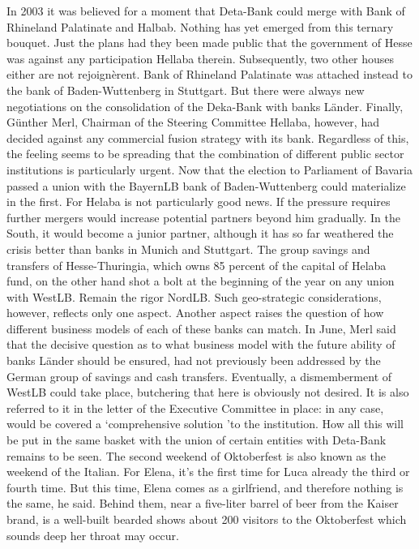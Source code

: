 In 2003 it was believed for a moment that Deta-Bank could merge with Bank of Rhineland Palatinate and Halbab.
Nothing has yet emerged from this ternary bouquet.
Just the plans had they been made public that the government of Hesse was against any participation Hellaba therein.
Subsequently, two other houses either are not rejoignèrent.
Bank of Rhineland Palatinate was attached instead to the bank of Baden-Wuttenberg in Stuttgart.
But there were always new negotiations on the consolidation of the Deka-Bank with banks Länder.
Finally, Günther Merl, Chairman of the Steering Committee Hellaba, however, had decided against any commercial fusion strategy with its bank.
Regardless of this, the feeling seems to be spreading that the combination of different public sector institutions is particularly urgent.
Now that the election to Parliament of Bavaria passed a union with the BayernLB bank of Baden-Wuttenberg could materialize in the first.
For Helaba is not particularly good news.
If the pressure requires further mergers would increase potential partners beyond him gradually.
In the South, it would become a junior partner, although it has so far weathered the crisis better than banks in Munich and Stuttgart.
The group savings and transfers of Hesse-Thuringia, which owns 85 percent of the capital of Helaba fund, on the other hand shot a bolt at the beginning of the year on any union with WestLB.
Remain the rigor NordLB.
Such geo-strategic considerations, however, reflects only one aspect.
Another aspect raises the question of how different business models of each of these banks can match.
In June, Merl said that the decisive question as to what business model with the future ability of banks Länder should be ensured, had not previously been addressed by the German group of savings and cash transfers.
Eventually, a dismemberment of WestLB could take place, butchering that here is obviously not desired.
It is also referred to it in the letter of the Executive Committee in place: in any case, would be covered a `comprehensive solution 'to the institution.
How all this will be put in the same basket with the union of certain entities with Deta-Bank remains to be seen.
The second weekend of Oktoberfest is also known as the weekend of the Italian.
For Elena, it's the first time for Luca already the third or fourth time.
But this time, Elena comes as a girlfriend, and therefore nothing is the same, he said.
Behind them, near a five-liter barrel of beer from the Kaiser brand, is a well-built bearded shows about 200 visitors to the Oktoberfest which sounds deep her throat may occur.
